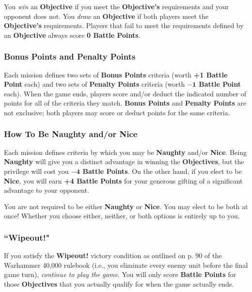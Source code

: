 \documentclass[12pt,titlepage]{article}
\begin{document}
You \textit{win} an \textbf{Objective} if you meet the \textbf{Objective's} requirements and your opponent does not. You \textit{draw} an \textbf{Objective} if both players meet the \textbf{Objective's} requirements. Players that fail to meet the requirements defined by an \textbf{Objective} always score \textbf{0 Battle Points}.

\subsubsection*{Bonus Points and Penalty Points}

Each mission defines two sets of \textbf{Bonus Points} criteria (worth \textbf{+1 Battle Point} each) and two sets of \textbf{Penalty Points} criteria (worth \textbf{$\mathbf{-1}$ Battle Point} each). When the game ends, players score and/or deduct the indicated number of points for all of the criteria they match. \textbf{Bonus Points} and \textbf{Penalty Points} are not exclusive; both players may score or deduct points for the same criteria.

\subsubsection*{How To Be Naughty and/or Nice}

Each mission defines criteria by which you may be \textbf{Naughty} and/or \textbf{Nice}. Being \textbf{Naughty} will give you a distinct advantage in winning the \textbf{Objectives}, but the privilege will cost you \textbf{$\mathbf{-4}$ Battle Points}. On the other hand, if you elect to be \textbf{Nice}, you will earn \textbf{+4 Battle Points} for your generous gifting of a significant advantage to your opponent.

You are not required to be either \textbf{Naughty} or \textbf{Nice}. You may elect to be both at once! Whether you choose either, neither, or both options is entirely up to you.

\subsubsection*{``Wipeout!"}

If you satisfy the \textbf{Wipeout!} victory condition as outlined on p. 90 of the Warhammer 40,000 rulebook (i.e., you eliminate every enemy unit before the final game turn), \textit{continue to play the game}. You will only score \textbf{Battle Points} for those \textbf{Objectives} that you actually qualify for when the game actually ends.
\end{document}
